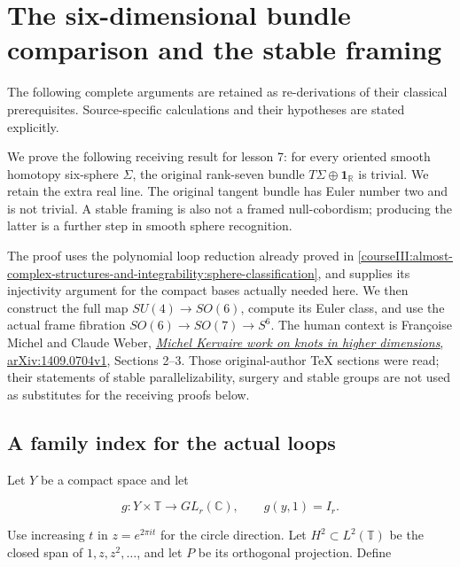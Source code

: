 \section{The six-dimensional bundle comparison and the stable framing}\label{courseIII:spin-six-and-the-framing-comparison:section}

The following complete arguments are retained as re-derivations of their classical prerequisites. Source-specific calculations and their hypotheses are stated explicitly.

We prove the following receiving result for lesson 7: for every oriented smooth homotopy six-sphere \(\Sigma\), the original rank-seven bundle \(T\Sigma\oplus\mathbf1_{\mathbb R}\) is trivial. We retain the extra real line. The original tangent bundle has Euler number two and is not trivial. A stable framing is also not a framed null-cobordism; producing the latter is a further step in smooth sphere recognition.

The proof uses the polynomial loop reduction already proved in \cref{courseIII:almost-complex-structures-and-integrability:sphere-classification}, and supplies its injectivity argument for the compact bases actually needed here. We then construct the full map \(SU(4)\to SO(6)\), compute its Euler class, and use the actual frame fibration \(SO(6)\to SO(7)\to S^6\). The human context is Françoise Michel and Claude Weber, \href{https://arxiv.org/abs/1409.0704v1}{\emph{Michel Kervaire work on knots in higher dimensions}, arXiv:1409.0704v1}, Sections 2--3. Those original-author TeX sections were read; their statements of stable parallelizability, surgery and stable groups are not used as substitutes for the receiving proofs below.

\subsection{A family index for the actual loops}
\label{courseIII:spin-six-and-the-framing-comparison:framing-family-index}

\label{courseIII:spin-six-and-the-framing-comparison:section-1}\label{courseIII:spin6:1}

Let \(Y\) be a compact space and let

\begin{equation}
g:Y\times\mathbb T\longrightarrow GL_r(\mathbb C),
\qquad g(y,1)=I_r.
\label{courseIII:spin-six-and-the-framing-comparison:eq:1.1}
\end{equation}

Use increasing \(t\) in \(z=e^{2\pi it}\) for the circle direction. Let \(H^2\subset L^2(\mathbb T)\) be the closed span of \(1,z,z^2,\ldots\), and let \(P\) be its orthogonal projection. Define

